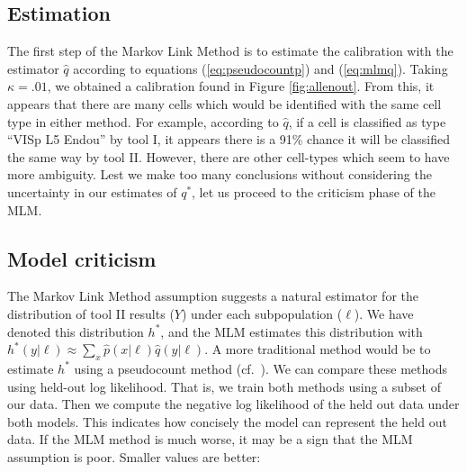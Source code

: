 \subsection{Estimation}


The first step of the Markov Link Method is to estimate the calibration with the estimator $\hat q$ according to equations (\ref{eq:pseudocountp}) and (\ref{eq:mlmq}).    Taking $\kappa=.01$, we obtained a calibration found in Figure \ref{fig:allenout}.  From this, it appears that there are many cells which would be identified with the same cell type in either method.  For example, according to $\hat q$, if a cell is classified as type ``VISp L5 Endou'' by tool I, it appears there is a 91\% chance it will be classified the same way by tool II.  However, there are other cell-types which seem to have more ambiguity.  Lest we make too many conclusions without considering the uncertainty in our estimates of $q^*$, let us proceed to the criticism phase of the MLM.

\subsection{Model criticism}

The Markov Link Method assumption suggests a natural estimator for the distribution of tool II results ($Y$) under each subpopulation ($\ell$).  We have denoted this distribution $h^*$, and the MLM estimates this distribution with $h^*(y|\ell)\approx \sum_x \hat p(x|\ell) \hat q(y|\ell)$.  A more traditional method would be to estimate $h^*$ using a pseudocount method (cf.\ \cite{flach2012machine}).  We can compare these methods using held-out log likelihood.  That is, we train both methods using a subset of our data.  Then we compute the negative log likelihood of the held out data under both models.  This indicates how concisely the model can represent the held out data.  If the MLM method is much worse, it may be a sign that the MLM assumption is poor.  Smaller values are better:

